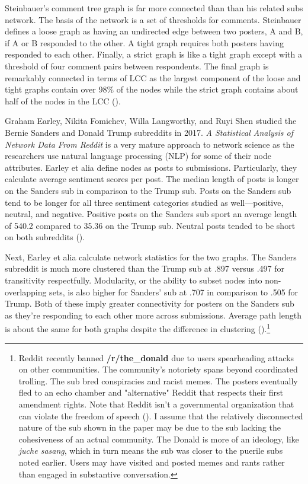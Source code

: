 \documentclass[12pt, a4paper]{article}
\begin{document}
Steinbauer's comment tree graph is far more connected than than his related subs network. The basis of the network is a set of thresholds for comments. Steinbauer defines a loose graph as having an undirected edge between two posters, A and B, if A or B responded to the other. A tight graph requires both posters having responded to each other. Finally, a strict graph is like a tight graph except with a threshold of four comment pairs between respondents. The final graph is remarkably connected in terms of LCC as the largest component of the loose and tight graphs contain over 98\% of the nodes while the strict graph contains about half of the nodes in the LCC (\cite{tbower_2011}).

Graham Earley, Nikita Fomichev, Willa Langworthy, and Ruyi Shen studied the Bernie Sanders and Donald Trump subreddits in 2017. \textit{A Statistical Analysis of Network Data From Reddit} is a very mature approach to network science as the researchers use natural language processing (NLP) for some of their node attributes. Earley et alia define nodes as posts to submissions. Particularly, they calculate average sentiment scores per post. The median length of posts is longer on the Sanders sub in comparison to the Trump sub. Posts on the Sanders sub tend to be longer for all three sentiment categories studied as well---positive, neutral, and negative. Positive posts on the Sanders sub sport an average length of 540.2 compared to 35.36 on the Trump sub. Neutral posts tended to be short on both subreddits (\cite{causeweb2017}).

Next, Earley et alia calculate network statistics for the two graphs. The Sanders subreddit is much more clustered than the Trump sub at .897 versus .497 for transitivity respectfully. Modularity, or the ability to subset nodes into non-overlapping sets, is also higher for Sanders' sub at .707 in comparison to .505 for Trump. Both of these imply greater connectivity for posters on the Sanders sub as they're responding to each other more across submissions. Average path length is about the same for both graphs despite the difference in clustering (\cite{causeweb2017}).\footnote{Reddit recently banned \textbf{/r/the\_donald} due to users spearheading attacks on other communities. The community's notoriety spans beyond coordinated trolling. The sub bred conspiracies and racist memes. The posters eventually fled to an echo chamber and "alternative" Reddit that respects their first amendment rights. Note that Reddit isn't a governmental organization that can violate the freedom of speech (\cite{thedonaldban2020}). I assume that the relatively disconnected nature of the sub shown in the paper may be due to the sub lacking the cohesiveness of an actual community. The Donald is more of an ideology, like \textit{juche sasang}, which in turn means the sub was closer to the puerile subs noted earlier. Users may have visited and posted memes and rants rather than engaged in substantive conversation.}
\end{document}
